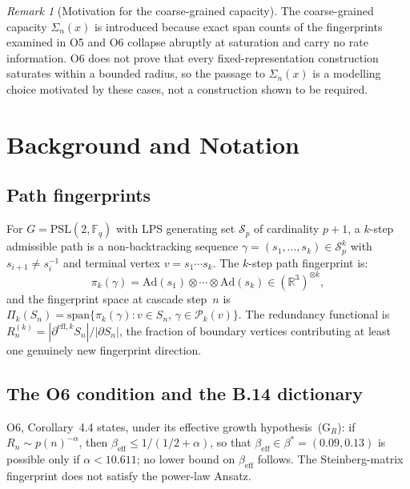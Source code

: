 \documentclass[11pt,a4paper]{article}
\theoremstyle{definition}
\theoremstyle{remark}
\newtheorem{remark}[theorem]{Remark}
\newcommand{\PSL}{\mathrm{PSL}(2,\mathbb{F}_q)}
\newcommand{\Sp}{\mathcal{S}_p}
\newcommand{\Ad}{\mathrm{Ad}}
\newcommand{\Pik}{\Pi_k}
\newcommand{\beff}{\beta_{\mathrm{eff}}}
\newcommand{\spann}{\mathrm{span}}
\newcommand{\Pk}{\mathcal{P}_k}
\begin{document}
  \begin{remark}[Motivation for the coarse-grained capacity]
    \label{rem:necessity}
    The coarse-grained capacity $\Sigma_n(x)$ is introduced because exact span counts of the
    fingerprints examined in O5 and O6 collapse abruptly at saturation and carry no rate
    information.
    O6 does not prove that every fixed-representation construction saturates within a bounded
    radius, so the passage to $\Sigma_n(x)$ is a modelling choice motivated by these cases, not a
    construction shown to be required.
  \end{remark}

  \section{Background and Notation}
  \label{sec:background}

  \subsection{Path fingerprints}
    \label{ssec:pf}

    For $G = \PSL$ with LPS generating set $\Sp$ of cardinality $p+1$,
    a $k$-step admissible path is a non-backtracking sequence
    $\gamma = (s_1,\ldots,s_k) \in \Sp^k$ with $s_{i+1} \neq s_i^{-1}$ and terminal vertex
    $v = s_1\cdots s_k$.
    The $k$-step path fingerprint is:
    \begin{equation}
      \label{eq:pik}
      \pi_k(\gamma) = \Ad(s_1)\otimes\cdots\otimes\Ad(s_k) \in (\mathbb{R}^3)^{\otimes k},
    \end{equation}
    and the fingerprint space at cascade step~$n$ is
    $\Pik(S_n) = \spann\{\pi_k(\gamma) : v\in S_n,\,\gamma\in\Pk(v)\}$.
    The redundancy functional is $R_n^{(k)} = |\partial^{\mathrm{eff},k}S_n|/|\partial S_n|$,
    the fraction of boundary vertices contributing at least one genuinely new fingerprint direction.

  \subsection{The O6 condition and the B.14 dictionary}
    \label{ssec:target-dict}

    O6, Corollary~4.4 states, under its effective growth hypothesis~(G$_R$): if $R_n \sim p(n)^{-\alpha}$,
    then $\beff \leq 1/(1/2+\alpha)$, so that $\beff \in \beta^* = (0.09, 0.13)$ is possible only if
    $\alpha < 10.611$; no lower bound on $\beff$ follows.
    The Steinberg-matrix fingerprint does not satisfy the power-law Ansatz.
\end{document}
